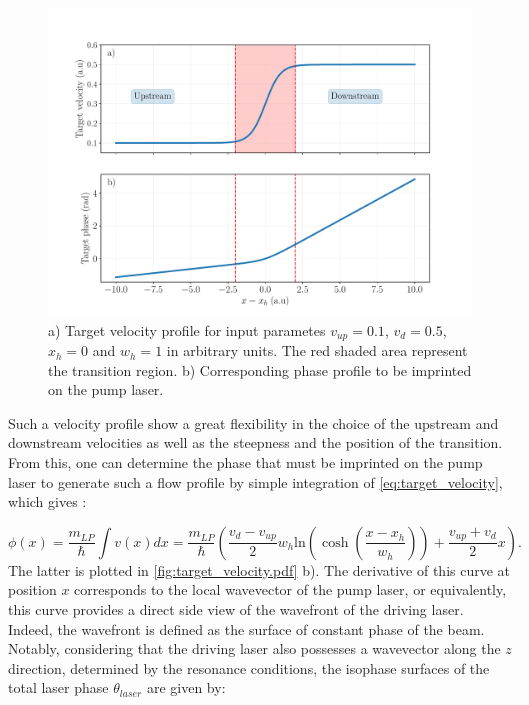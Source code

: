 \begin{figure}[h]
    \centering
    \includegraphics[width=1\textwidth]{chap_custom_st/fig/target_velocity.pdf}
    \caption{ a) Target velocity profile for input parametes $v_{up}=0.1$, $v_{d}=0.5$, $x_h=0$ and $w_h=1$ in arbitrary units. The red shaded area represent the 
    transition region. b) Corresponding phase profile to be imprinted on the pump laser.}
    \label{fig:target_velocity.pdf}
\end{figure}

Such a velocity profile show a great flexibility in the choice of the upstream and downstream velocities as well as the steepness and the position of the transition. From 
this, one can determine the phase that must be imprinted on the pump laser to generate such a flow profile by simple integration of \autoref{eq:target_velocity}, which gives :

\begin{equation}
    \phi(x) = \dfrac{m_{LP}}{\hbar} \int v(x) dx = \dfrac{m_{LP}}{\hbar} \left( \dfrac{v_{d}-v_{up}}{2} w_h \mathrm{ln}(\cosh(\dfrac{x-x_h}{w_h}))+\dfrac{v_{up}+v_{d}}{2}x \right).
    \label{eq:target_phase_profile}
\end{equation}
The latter is plotted in \autoref{fig:target_velocity.pdf} b). The derivative of this curve at position $x$ corresponds to the local wavevector of the pump laser, or equivalently, this curve provides a direct side view of the wavefront of the driving laser.
 Indeed, the wavefront is defined as the surface of constant phase of the beam. Notably, considering that the driving laser also possesses a wavevector along the $z$ direction, determined by the resonance conditions, the isophase surfaces of the total laser phase $\theta_{laser}$ are given by:  

